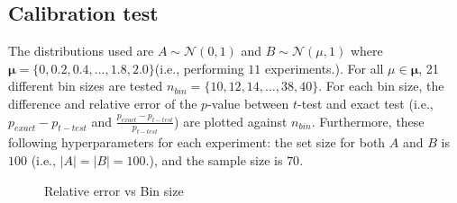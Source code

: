\documentclass[a4paper]{article}
\begin{document}
\subsection{Calibration test}
The distributions used are $A \sim \mathcal{N}(0,1)$ and $B \sim \mathcal{N}(\mu,1)$ where $\boldsymbol{\mu} = \{0, 0.2, 0.4, \ldots, 1.8, 2.0 \}$(i.e., performing $11$ experiments.). For all $\mu \in \boldsymbol{\mu}$, 21 different bin sizes are tested $n_{bin}=\{10,12,14,\ldots,38,40\}$. For each bin size, the difference and relative error of the $p$-value between $t$-test and exact test (i.e., $p_{exact}-p_{t-test}$  and $\frac{p_{exact}-p_{t-test}}{p_{t-test}}$) are plotted against $n_{bin}$. Furthermore, these following hyperparameters for each experiment: the set size for both $A$ and $B$ is $100$ (i.e., $|A|=|B|=100$.), and the sample size is $70$.
\begin{figure}[H]
  \centering
  \hfill
  \caption{Relative error vs Bin size}
\end{figure}
\end{document}
